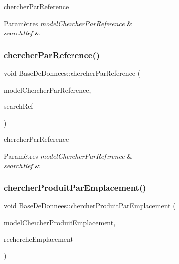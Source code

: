 chercher\+Par\+Reference 


\begin{DoxyParams}{Paramètres}
{\em model\+Chercher\+Par\+Reference} & \\
\hline
{\em search\+Ref} & \\
\hline
\end{DoxyParams}
\mbox{\label{class_base_de_donnees_aaa4a62ca5864ce24cb0b3d488a609811}} 
\subsubsection{\texorpdfstring{chercher\+Par\+Reference()}{chercherParReference()}\hspace{0.1cm}{\footnotesize\ttfamily [2/2]}}
{\footnotesize\ttfamily void Base\+De\+Donnees\+::chercher\+Par\+Reference (\begin{DoxyParamCaption}\item[{Q\+Sql\+Query\+Model $\ast$}]{model\+Chercher\+Par\+Reference,  }\item[{Q\+String}]{search\+Ref }\end{DoxyParamCaption})}



chercher\+Par\+Reference 


\begin{DoxyParams}{Paramètres}
{\em model\+Chercher\+Par\+Reference} & \\
\hline
{\em search\+Ref} & \\
\hline
\end{DoxyParams}
\mbox{\label{class_base_de_donnees_a7741ad517714e619d7f8a0f202d3b38d}} 
\subsubsection{\texorpdfstring{chercher\+Produit\+Par\+Emplacement()}{chercherProduitParEmplacement()}\hspace{0.1cm}{\footnotesize\ttfamily [1/2]}}
{\footnotesize\ttfamily void Base\+De\+Donnees\+::chercher\+Produit\+Par\+Emplacement (\begin{DoxyParamCaption}\item[{Q\+Sql\+Query\+Model $\ast$}]{model\+Chercher\+Produit\+Emplacement,  }\item[{Q\+String}]{recherche\+Emplacement }\end{DoxyParamCaption})}



